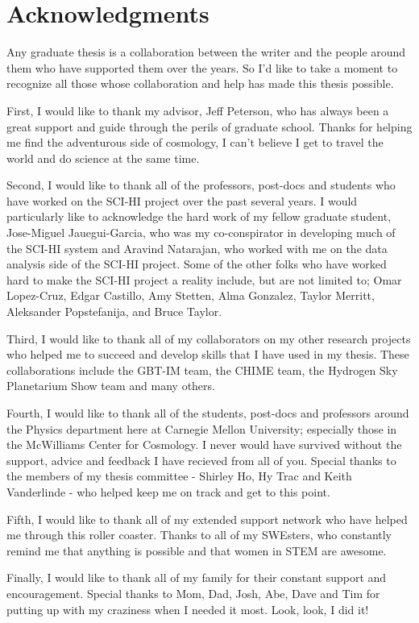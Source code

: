 \section*{Acknowledgments}

Any graduate thesis is a collaboration between the writer and the people around them who have supported them over the years. So I'd like to take a moment to recognize all those whose collaboration and help has made this thesis possible. 

First, I would like to thank my advisor, Jeff Peterson, who has always been a great support and guide through the perils of graduate school. Thanks for helping me find the adventurous side of cosmology, I can't believe I get to travel the world and do science at the same time.

Second, I would like to thank all of the professors, post-docs and students who have worked on the SCI-HI project over the past several years. I would particularly like to acknowledge the hard work of my fellow graduate student, Jose-Miguel Jauegui-Garcia, who was my co-conspirator in developing much of the SCI-HI system and Aravind Natarajan, who worked with me on the data analysis side of the SCI-HI project. Some of the other folks who have worked hard to make the SCI-HI project a reality include, but are not limited to; Omar Lopez-Cruz, Edgar Castillo, Amy Stetten, Alma Gonzalez, Taylor Merritt, Aleksander Popstefanija, and Bruce Taylor. 

Third, I would like to thank all of my collaborators on my other research projects who helped me to succeed and develop skills that I have used in my thesis. These collaborations include the GBT-IM team, the CHIME team, the Hydrogen Sky Planetarium Show team and many others. 

Fourth, I would like to thank all of the students, post-docs and professors around the Physics department here at Carnegie Mellon University; especially those in the McWilliams Center for Cosmology. I never would have survived without the support, advice and feedback I have recieved from all of you. Special thanks to the members of my thesis committee - Shirley Ho, Hy Trac and Keith Vanderlinde - who helped keep me on track and get to this point. 

Fifth, I would like to thank all of my extended support network who have helped me through this roller coaster. Thanks to all of my SWEsters, who constantly remind me that anything is possible and that women in STEM are awesome. 

Finally, I would like to thank all of my family for their constant support and encouragement. Special thanks to Mom, Dad, Josh, Abe, Dave and Tim for putting up with my craziness when I needed it most. Look, look, I did it!

